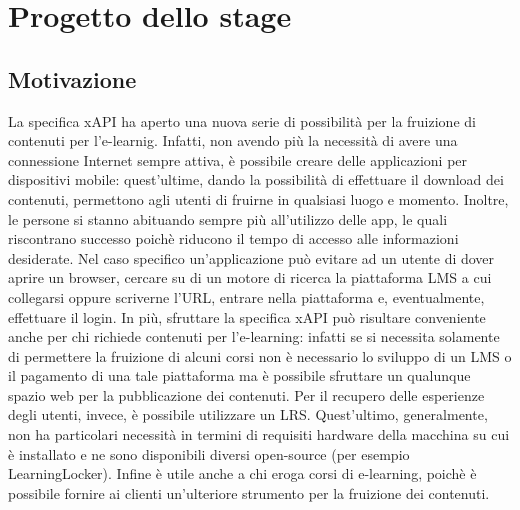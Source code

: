 \documentclass[../Tesi.tex]{subfiles}
\begin{document}
\section{Progetto dello stage}\label{sec:progettoStage}
	\subsection{Motivazione}
	La specifica xAPI ha aperto una nuova serie di possibilità per la fruizione di contenuti per l'e-learnig. Infatti, non avendo più la necessità di avere una connessione Internet sempre attiva, è possibile creare delle applicazioni per dispositivi mobile: quest'ultime, dando la possibilità di effettuare il download dei contenuti, permettono agli utenti di fruirne in qualsiasi luogo e momento. Inoltre, le persone si stanno abituando sempre più all'utilizzo delle app, le quali riscontrano successo poichè riducono il tempo di accesso alle informazioni desiderate. Nel caso specifico un'applicazione può evitare ad un utente di dover aprire un browser, cercare su di un motore di ricerca la piattaforma LMS a cui collegarsi oppure scriverne l'URL, entrare nella piattaforma e, eventualmente, effettuare il login. In più, sfruttare la specifica xAPI può risultare conveniente anche per chi richiede contenuti per l’e-learning: infatti se si necessita solamente di permettere la fruizione di alcuni corsi non è necessario lo sviluppo di un LMS o il pagamento di una tale piattaforma ma è possibile sfruttare un qualunque spazio web per la pubblicazione dei contenuti. Per il recupero delle esperienze degli utenti, invece, è possibile utilizzare un LRS. Quest'ultimo, generalmente, non ha particolari necessità in termini di requisiti hardware della macchina su cui è installato e ne sono disponibili diversi open-source (per esempio LearningLocker). Infine è utile anche a chi eroga corsi di e-learning, poichè è possibile fornire ai clienti un’ulteriore strumento per la fruizione dei contenuti.
\end{document}
